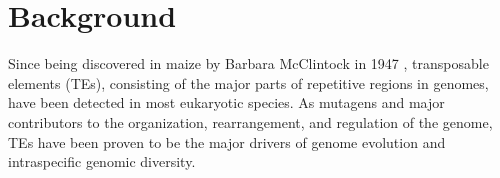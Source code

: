 \documentclass{bmcart}
\begin{document}


\section*{Background}
Since being discovered in maize by Barbara McClintock in 1947 \cite{mcclintock1947mutable, mcclintock1950origin}, transposable elements (TEs), consisting of the major parts of repetitive regions in genomes, have been detected in most eukaryotic species\cite{bourque2018ten, wells2020field}. As mutagens and major contributors to the organization, rearrangement, and regulation of the genome, TEs have been proven to be the major drivers of genome evolution and intraspecific genomic diversity\cite{quesneville2020twenty, kalendar2021mobile, kazazian2004mobile}.
\end{document}
